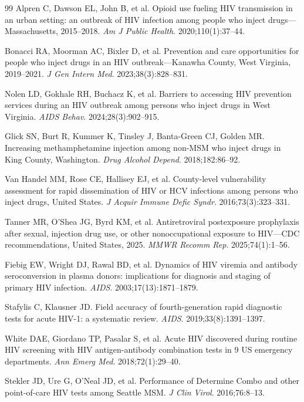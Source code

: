 \documentclass[11pt]{article}
\begin{document}
\begin{thebibliography}{99}
 Alpren C, Dawson EL, John B, et al. Opioid use fueling HIV transmission in an urban setting: an outbreak of HIV infection among people who inject drugs---Massachusetts, 2015--2018. \emph{Am J Public Health}. 2020;110(1):37--44.

 Bonacci RA, Moorman AC, Bixler D, et al. Prevention and care opportunities for people who inject drugs in an HIV outbreak---Kanawha County, West Virginia, 2019--2021. \emph{J Gen Intern Med}. 2023;38(3):828--831.

 Nolen LD, Gokhale RH, Buchacz K, et al. Barriers to accessing HIV prevention services during an HIV outbreak among persons who inject drugs in West Virginia. \emph{AIDS Behav}. 2024;28(3):902--915.

 Glick SN, Burt R, Kummer K, Tinsley J, Banta-Green CJ, Golden MR. Increasing methamphetamine injection among non-MSM who inject drugs in King County, Washington. \emph{Drug Alcohol Depend}. 2018;182:86--92.

 Van Handel MM, Rose CE, Hallisey EJ, et al. County-level vulnerability assessment for rapid dissemination of HIV or HCV infections among persons who inject drugs, United States. \emph{J Acquir Immune Defic Syndr}. 2016;73(3):323--331.

 Tanner MR, O'Shea JG, Byrd KM, et al. Antiretroviral postexposure prophylaxis after sexual, injection drug use, or other nonoccupational exposure to HIV---CDC recommendations, United States, 2025. \emph{MMWR Recomm Rep}. 2025;74(1):1--56.

 Fiebig EW, Wright DJ, Rawal BD, et al. Dynamics of HIV viremia and antibody seroconversion in plasma donors: implications for diagnosis and staging of primary HIV infection. \emph{AIDS}. 2003;17(13):1871--1879.

 Stafylis C, Klausner JD. Field accuracy of fourth-generation rapid diagnostic tests for acute HIV-1: a systematic review. \emph{AIDS}. 2019;33(8):1391--1397.

 White DAE, Giordano TP, Pasalar S, et al. Acute HIV discovered during routine HIV screening with HIV antigen-antibody combination tests in 9 US emergency departments. \emph{Ann Emerg Med}. 2018;72(1):29--40.

 Stekler JD, Ure G, O'Neal JD, et al. Performance of Determine Combo and other point-of-care HIV tests among Seattle MSM. \emph{J Clin Virol}. 2016;76:8--13.


\end{thebibliography}
\end{document}

